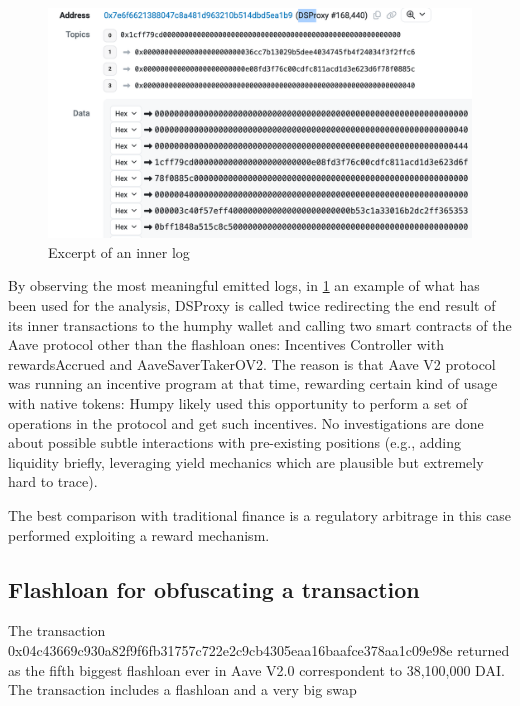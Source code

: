 \documentclass[11pt,a4paper,titlepage]{scrartcl}
\begin{document}
\begin{figure}[ht]
    \centering %
    \includegraphics[width=\textwidth, keepaspectratio]{image/humpyDSProxy/innerlog.png}
    \caption{Excerpt of an inner log}
    \label{fig:humphy2}
\end{figure}

By observing the most meaningful emitted logs, in \ref{fig:humphy2} an example of what has been used for the analysis,  DSProxy is called twice redirecting the end result of its inner transactions to the humphy wallet and calling two smart contracts of the Aave protocol other than the flashloan ones:  Incentives Controller with rewardsAccrued  and AaveSaverTakerOV2.
The  reason is that Aave V2 protocol was running an incentive program at that time, rewarding certain kind of usage with native tokens: Humpy likely used this opportunity to perform a set of operations in the protocol and get such incentives.
 No investigations are done about possible  subtle interactions with pre-existing positions (e.g., adding liquidity briefly, leveraging yield mechanics which are  plausible but extremely hard to trace).
 
The best comparison with traditional finance is a regulatory arbitrage in this case performed exploiting a reward mechanism.




\subsection{Flashloan for obfuscating a transaction }

The transaction 0x04c43669c930a82f9f6fb31757c722e2c9cb4305eaa16baafce378aa1c09e98e returned as the fifth biggest flashloan ever in Aave V2.0 correspondent to 38,100,000 DAI. 
The transaction includes a flashloan and  a very big swap
\end{document}
